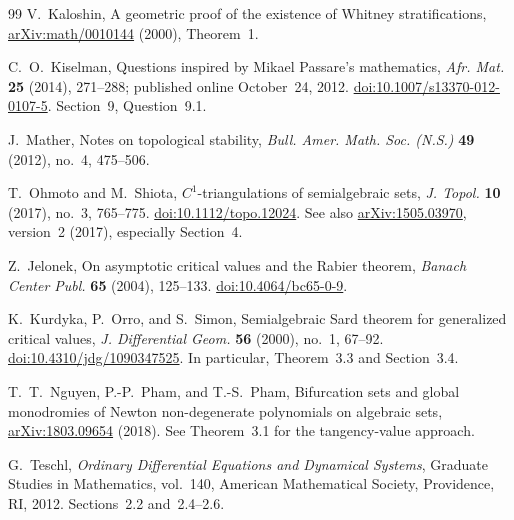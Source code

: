 \documentclass[11pt]{article}
\numberwithin{equation}{section}
\theoremstyle{definition}
\theoremstyle{remark}
\newcommand{\arxiv}[1]{\href{https://arxiv.org/abs/#1}{arXiv:#1}}
\begin{document}
\begin{thebibliography}{99}
V.~Kaloshin,
A geometric proof of the existence of Whitney stratifications,
\arxiv{math/0010144} (2000), Theorem~1.

C.~O.~Kiselman,
Questions inspired by Mikael Passare's mathematics,
\emph{Afr. Mat.} \textbf{25} (2014), 271--288;
published online October~24, 2012.
\href{https://doi.org/10.1007/s13370-012-0107-5}{doi:10.1007/s13370-012-0107-5}.
Section~9, Question~9.1.

J.~Mather,
Notes on topological stability,
\emph{Bull. Amer. Math. Soc. (N.S.)} \textbf{49} (2012), no.~4, 475--506.

T.~Ohmoto and M.~Shiota,
$C^1$-triangulations of semialgebraic sets,
\emph{J. Topol.} \textbf{10} (2017), no.~3, 765--775.
\href{https://doi.org/10.1112/topo.12024}{doi:10.1112/topo.12024}.
See also \arxiv{1505.03970}, version~2 (2017), especially Section~4.

Z.~Jelonek,
On asymptotic critical values and the Rabier theorem,
\emph{Banach Center Publ.} \textbf{65} (2004), 125--133.
\href{https://doi.org/10.4064/bc65-0-9}{doi:10.4064/bc65-0-9}.

K.~Kurdyka, P.~Orro, and S.~Simon,
Semialgebraic Sard theorem for generalized critical values,
\emph{J. Differential Geom.} \textbf{56} (2000), no.~1, 67--92.
\href{https://doi.org/10.4310/jdg/1090347525}{doi:10.4310/jdg/1090347525}.
In particular, Theorem~3.3 and Section~3.4.

T.~T.~Nguyen, P.-P.~Pham, and T.-S.~Pham,
Bifurcation sets and global monodromies of Newton non-degenerate
polynomials on algebraic sets, \arxiv{1803.09654} (2018).
See Theorem~3.1 for the tangency-value approach.

G.~Teschl,
\emph{Ordinary Differential Equations and Dynamical Systems},
Graduate Studies in Mathematics, vol.~140, American Mathematical Society,
Providence, RI, 2012. Sections~2.2 and~2.4--2.6.

\end{thebibliography}
\end{document}
